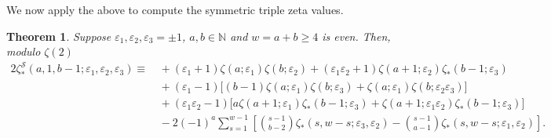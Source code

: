 \documentclass{article}
\newcommand{\Sy}{{\mathcal S}}
\newcommand\eps{{\varepsilon}}
\newcommand{\N}{\mathbb{N}}
\theoremstyle{plain}
\newtheorem{thm}{Theorem}[section]
\theoremstyle{definition}
\begin{document}
We now apply the above to compute the symmetric triple zeta values.
\begin{thm}\label{thm:SMZV(a,1,b-1;e1,e2,e3)}
Suppose $\eps_1, \eps_2,\eps_3 =\pm 1$, $a,b\in\N$ and $w=a+b\ge 4$ is even. Then, modulo $\zeta(2)$
\begin{align*}
2\zeta_\ast^\Sy(a,1,b-1; \eps_1,\eps_2,\eps_3)
 \equiv&\,    + (\eps_1+1)\zeta(a;\eps_1)\zeta(b;\eps_2) + (\eps_1 \eps_2+1)\zeta(a+1; \eps_2)\zeta_*(b-1;\eps_3)  \\
&\,+ (\eps_1-1) \Big[(b-1)\zeta(a;\eps_1)\zeta(b; \eps_3)+\zeta(a;\eps_1)\zeta(b;\eps_2\eps_3)\Big] \\
&\, + (\eps_1 \eps_2-1) \Big[ a \zeta(a+1; \eps_1)\zeta_*(b-1;\eps_3)+\zeta(a+1; \eps_1\eps_2)\zeta_*(b-1;\eps_3)\Big]\\
&\,    -2(-1)^{a}\sum_{s=1}^{w-1}\left[ \binom{s-1}{b-2} \zeta_*(s,w-s;\eps_3,\eps_2) -\binom{s-1}{a-1}\zeta_*(s,w-s;\eps_1,\eps_2)\right] .
\end{align*}
\end{thm}
\end{document}
